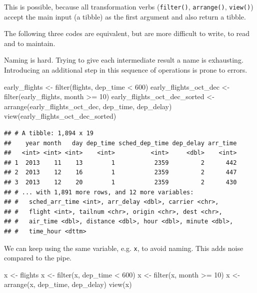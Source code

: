 \documentclass[]{book}
\newenvironment{Shaded}{}{}
\newcommand{\DecValTok}[1]{#1}
\newcommand{\KeywordTok}[1]{\textcolor[rgb]{0.00,0.00,1.00}{#1}}
\newcommand{\NormalTok}[1]{#1}
\newcommand{\OperatorTok}[1]{#1}
\newcommand{\StringTok}[1]{\textcolor[rgb]{0.00,0.50,0.50}{#1}}
\begin{document}
This is possible, because all transformation verbs (\texttt{filter()}, \texttt{arrange()}, \texttt{view()}) accept the main input (a tibble) as the first argument and also return a tibble.

The following three codes are equivalent, but are more difficult to write, to read and to maintain.

Naming is hard.
Trying to give each intermediate result a name is exhausting.
Introducing an additional step in this sequence of operations is prone to errors.

\begin{Shaded}
\begin{Highlighting}[]
\NormalTok{early_flights <-}\StringTok{ }\KeywordTok{filter}\NormalTok{(flights, dep_time }\OperatorTok{<}\StringTok{ }\DecValTok{600}\NormalTok{)}
\NormalTok{early_flights_oct_dec <-}\StringTok{ }\KeywordTok{filter}\NormalTok{(early_flights, month }\OperatorTok{>=}\StringTok{ }\DecValTok{10}\NormalTok{)}
\NormalTok{early_flights_oct_dec_sorted <-}\StringTok{ }\KeywordTok{arrange}\NormalTok{(early_flights_oct_dec, dep_time, dep_delay)}
\KeywordTok{view}\NormalTok{(early_flights_oct_dec_sorted)}
\end{Highlighting}
\end{Shaded}

\begin{verbatim}
## # A tibble: 1,894 x 19
##    year month   day dep_time sched_dep_time dep_delay arr_time
##   <int> <int> <int>    <int>          <int>     <dbl>    <int>
## 1  2013    11    13        1           2359         2      442
## 2  2013    12    16        1           2359         2      447
## 3  2013    12    20        1           2359         2      430
## # ... with 1,891 more rows, and 12 more variables:
## #   sched_arr_time <int>, arr_delay <dbl>, carrier <chr>,
## #   flight <int>, tailnum <chr>, origin <chr>, dest <chr>,
## #   air_time <dbl>, distance <dbl>, hour <dbl>, minute <dbl>,
## #   time_hour <dttm>
\end{verbatim}

We can keep using the same variable, e.g. \texttt{x}, to avoid naming.
This adds noise compared to the pipe.

\begin{Shaded}
\begin{Highlighting}[]
\NormalTok{x <-}\StringTok{ }\NormalTok{flights}
\NormalTok{x <-}\StringTok{ }\KeywordTok{filter}\NormalTok{(x, dep_time }\OperatorTok{<}\StringTok{ }\DecValTok{600}\NormalTok{)}
\NormalTok{x <-}\StringTok{ }\KeywordTok{filter}\NormalTok{(x, month }\OperatorTok{>=}\StringTok{ }\DecValTok{10}\NormalTok{)}
\NormalTok{x <-}\StringTok{ }\KeywordTok{arrange}\NormalTok{(x, dep_time, dep_delay)}
\KeywordTok{view}\NormalTok{(x)}
\end{Highlighting}
\end{Shaded}
\end{document}
